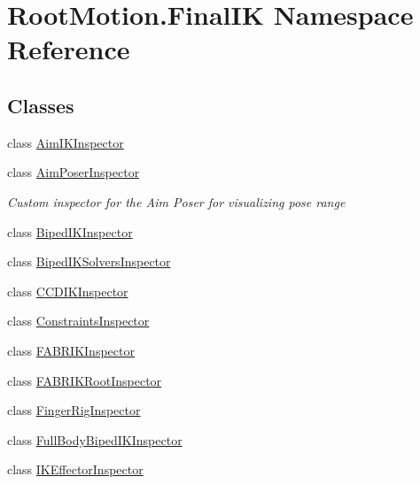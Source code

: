 \hypertarget{namespace_root_motion_1_1_final_i_k}{}\section{Root\+Motion.\+Final\+IK Namespace Reference}
\label{namespace_root_motion_1_1_final_i_k}
\subsection*{Classes}
\begin{DoxyCompactItemize}
\item 
class \mbox{\hyperlink{class_root_motion_1_1_final_i_k_1_1_aim_i_k_inspector}{Aim\+I\+K\+Inspector}}
\item 
class \mbox{\hyperlink{class_root_motion_1_1_final_i_k_1_1_aim_poser_inspector}{Aim\+Poser\+Inspector}}
\begin{DoxyCompactList}\small\item\em Custom inspector for the Aim Poser for visualizing pose range \end{DoxyCompactList}\item 
class \mbox{\hyperlink{class_root_motion_1_1_final_i_k_1_1_biped_i_k_inspector}{Biped\+I\+K\+Inspector}}
\item 
class \mbox{\hyperlink{class_root_motion_1_1_final_i_k_1_1_biped_i_k_solvers_inspector}{Biped\+I\+K\+Solvers\+Inspector}}
\item 
class \mbox{\hyperlink{class_root_motion_1_1_final_i_k_1_1_c_c_d_i_k_inspector}{C\+C\+D\+I\+K\+Inspector}}
\item 
class \mbox{\hyperlink{class_root_motion_1_1_final_i_k_1_1_constraints_inspector}{Constraints\+Inspector}}
\item 
class \mbox{\hyperlink{class_root_motion_1_1_final_i_k_1_1_f_a_b_r_i_k_inspector}{F\+A\+B\+R\+I\+K\+Inspector}}
\item 
class \mbox{\hyperlink{class_root_motion_1_1_final_i_k_1_1_f_a_b_r_i_k_root_inspector}{F\+A\+B\+R\+I\+K\+Root\+Inspector}}
\item 
class \mbox{\hyperlink{class_root_motion_1_1_final_i_k_1_1_finger_rig_inspector}{Finger\+Rig\+Inspector}}
\item 
class \mbox{\hyperlink{class_root_motion_1_1_final_i_k_1_1_full_body_biped_i_k_inspector}{Full\+Body\+Biped\+I\+K\+Inspector}}
\item 
class \mbox{\hyperlink{class_root_motion_1_1_final_i_k_1_1_i_k_effector_inspector}{I\+K\+Effector\+Inspector}}

\end{DoxyCompactItemize}
